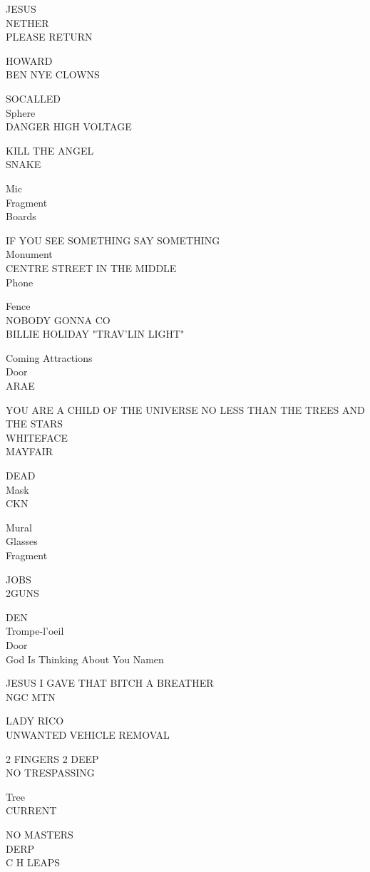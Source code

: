 \documentclass[10pt,letterpaper]{article}
\begin{document}
JESUS\\
NETHER\\
PLEASE RETURN

HOWARD\\
BEN NYE CLOWNS

SOCALLED\\
Sphere\\
DANGER HIGH VOLTAGE

KILL THE ANGEL\\
SNAKE

Mic\\
Fragment\\
Boards

IF YOU SEE SOMETHING SAY SOMETHING\\
Monument\\
CENTRE STREET IN THE MIDDLE\\
Phone

Fence\\
NOBODY GONNA CO\\
BILLIE HOLIDAY "TRAV'LIN LIGHT"

Coming Attractions\\
Door\\
ARAE

YOU ARE A CHILD OF THE UNIVERSE NO LESS THAN THE TREES AND THE STARS\\
WHITEFACE\\
MAYFAIR

DEAD\\
Mask\\
CKN

Mural\\
Glasses\\
Fragment

JOBS\\
2GUNS

DEN\\
Trompe{-}l'oeil\\
Door\\
God Is Thinking About You Namen

JESUS I GAVE THAT BITCH A BREATHER\\
NGC MTN

LADY RICO\\
UNWANTED VEHICLE REMOVAL

2 FINGERS 2 DEEP\\
NO TRESPASSING

Tree\\
CURRENT

NO MASTERS\\
DERP\\
C H LEAPS
\end{document}
